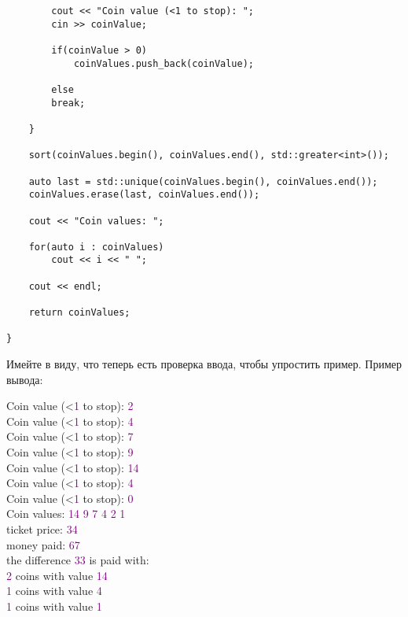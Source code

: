 \begin{tcolorbox}
\begin{verbatim}
        cout << "Coin value (<1 to stop): ";
        cin >> coinValue;
        
        if(coinValue > 0)
            coinValues.push_back(coinValue);
        
        else
        break;
    
    }
    
    sort(coinValues.begin(), coinValues.end(), std::greater<int>());
    
    auto last = std::unique(coinValues.begin(), coinValues.end());
    coinValues.erase(last, coinValues.end());
    
    cout << "Coin values: ";
    
    for(auto i : coinValues)
        cout << i << " ";
    
    cout << endl;
    
    return coinValues;

}
\end{verbatim}
\end{tcolorbox}

Имейте в виду, что теперь есть проверка ввода, чтобы упростить пример. Пример вывода:

\vspace{\baselineskip}

\begin{tcolorbox}
{
Coin value (<\textcolor{Purple}{1} to stop): \textcolor{Purple}{2} \\
Coin value (<\textcolor{Purple}{1} to stop): \textcolor{Purple}{4} \\
Coin value (<\textcolor{Purple}{1} to stop): \textcolor{Purple}{7} \\
Coin value (<\textcolor{Purple}{1} to stop): \textcolor{Purple}{9} \\
Coin value (<\textcolor{Purple}{1} to stop): \textcolor{Purple}{14} \\
Coin value (<\textcolor{Purple}{1} to stop): \textcolor{Purple}{4} \\
Coin value (<\textcolor{Purple}{1} to stop): \textcolor{Purple}{0} \\
Coin values: \textcolor{Purple}{14 9 7 4 2 1} \\
ticket price: \textcolor{Purple}{34} \\
money paid: \textcolor{Purple}{67} \\
the difference \textcolor{Purple}{33} is paid with: \\
\textcolor{Purple}{2} coins with value \textcolor{Purple}{14} \\
\textcolor{Purple}{1} coins with value \textcolor{Purple}{4} \\
\textcolor{Purple}{1} coins with value \textcolor{Purple}{1}}
\end{tcolorbox}

